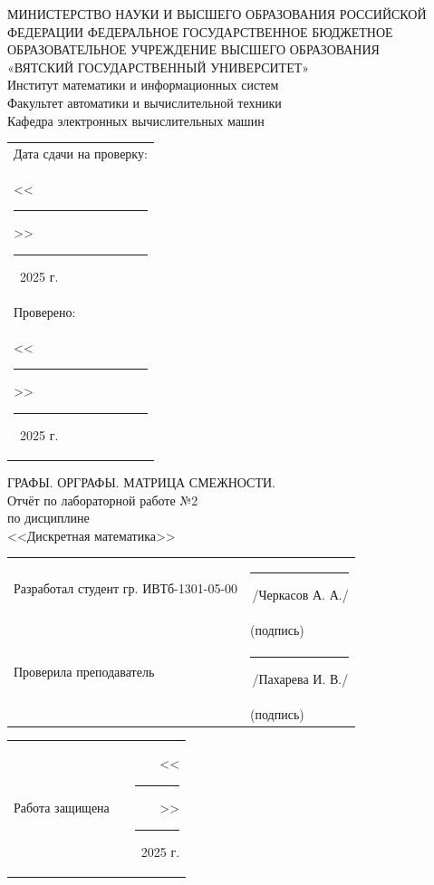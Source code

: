 \documentclass[oneside,a4paper,14pt]{extarticle}
\begin{document}
\newpage
\thispagestyle{empty}
\begin{center}
	МИНИСТЕРСТВО НАУКИ И ВЫСШЕГО ОБРАЗОВАНИЯ РОССИЙСКОЙ ФЕДЕРАЦИИ ФЕДЕРАЛЬНОЕ ГОСУДАРСТВЕННОЕ БЮДЖЕТНОЕ ОБРАЗОВАТЕЛЬНОЕ УЧРЕЖДЕНИЕ ВЫСШЕГО ОБРАЗОВАНИЯ\\
	«ВЯТСКИЙ ГОСУДАРСТВЕННЫЙ УНИВЕРСИТЕТ»\\
	Институт математики и информационных систем\\
	Факультет автоматики и вычислительной техники\\
	Кафедра электронных вычислительных машин
\end{center}
\vspace{10mm}

\hfill
\begin{tabular}{l}
  \footnotesize Дата сдачи на проверку: \\
  \footnotesize <<\rule[-1mm]{5mm}{0.10mm}\/>>\rule[-1mm]{20mm}{0.10mm}\ 2025 г.\\
  \footnotesize Проверено: \\
  \footnotesize <<\rule[-1mm]{5mm}{0.10mm}\/>>\rule[-1mm]{20mm}{0.10mm}\ 2025 г. \\
\end{tabular}
\vfill

\begin{center}
	ГРАФЫ. ОРГРАФЫ. МАТРИЦА СМЕЖНОСТИ.\\
	Отчёт по лабораторной работе №2\\
	по дисциплине\\
	<<Дискретная математика>>\\
\end{center}
\vspace{25mm}
\noindent
\begin{tabular}{ll}
	Разработал студент гр. ИВТб-1301-05-00 & \rule[-1mm]{30mm}{0.10mm}\,/Черкасов А. А./   \\
	                                       & \hspace{8mm}\footnotesize(подпись)            \\
	Проверила преподаватель                & \rule[-1mm]{30mm}{0.10mm}\,/Пахарева И. В./ \\
	                                       & \hspace{8mm}\footnotesize(подпись)            \\
\end{tabular}

\noindent
  \begin{tabular}{lp{58mm}r}
    Работа защищена &  & <<\rule[-1mm]{5mm}{0.10mm}\/>>\rule[-1mm]{30mm}{0.10mm}\ 2025 г.
  \end{tabular}
  \vfill
\end{document}
